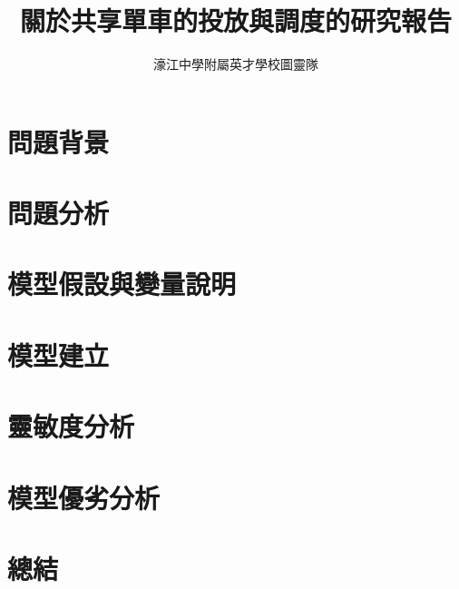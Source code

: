 \documentclass[12pt]{myClass}
\title{關於共享單車的投放與調度的研究報告}
\author{濠江中學附屬英才學校圖靈隊}
\date{}
\begin{document}
\maketitle
\begin{abstract}
  
\end{abstract}
\newpage
\tableofcontents
\newpage
\section{問題背景}

\newpage

\section{問題分析}

\newpage

\section{模型假設與變量說明}

\newpage

\section{模型建立}

\newpage

\section{靈敏度分析}

\newpage

\section{模型優劣分析}

\newpage

\section{總結}

\end{document}
